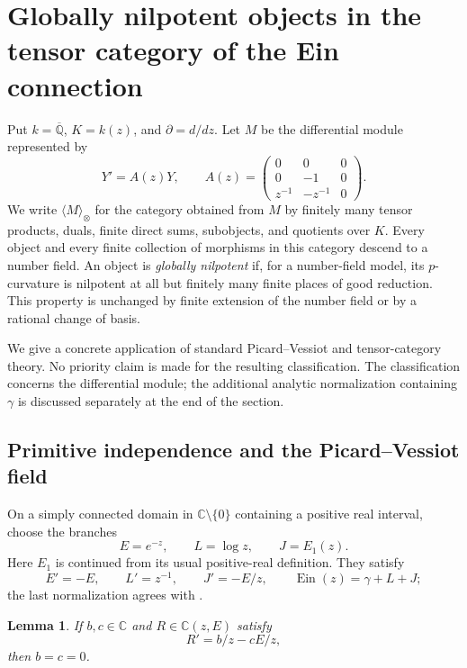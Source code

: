 \documentclass[11pt,a4paper]{article}
\newcommand{\C}{\mathbb C}
\newcommand{\Qbar}{\overline{\mathbb Q}}
\newcommand{\Ein}{\operatorname{Ein}}
\newtheorem{lemma}[theorem]{Lemma}
\theoremstyle{definition}
\theoremstyle{remark}
\numberwithin{equation}{section}
\begin{document}
\section{Globally nilpotent objects in the tensor category of the Ein connection}
\label{at:ten:section}

Put $k=\Qbar$, $K=k(z)$, and $\partial=d/dz$.  Let $M$ be the
differential module represented by
\begin{equation}\label{at:ten:connection}
 Y'=A(z)Y,\qquad
 A(z)=\begin{pmatrix}
 0&0&0\\
 0&-1&0\\
 z^{-1}&-z^{-1}&0
 \end{pmatrix}.
\end{equation}
We write $\langle M\rangle_\otimes$ for the category obtained from $M$
by finitely many tensor products, duals, finite direct sums, subobjects,
and quotients over $K$.  Every object and every finite collection of
morphisms in this category descend to a number field.  An object is
\emph{globally nilpotent} if, for a number-field model, its
$p$-curvature is nilpotent at all but finitely many finite places of
good reduction.  This property is unchanged by finite extension of
the number field or by a rational change of basis.

We give a concrete application of standard Picard--Vessiot and
tensor-category theory.  No priority claim is made for the resulting
classification.  The classification concerns the differential module;
the additional analytic normalization containing $\gamma$ is discussed
separately at the end of the section.

\subsection{Primitive independence and the Picard--Vessiot field}

On a simply connected domain in $\C\setminus\{0\}$ containing a
positive real interval, choose the branches
\[
 E=e^{-z},\qquad L=\log z,\qquad J=E_1(z).
\]
Here $E_1$ is continued from its usual positive-real definition.  They
satisfy
\begin{equation}\label{at:ten:derivatives}
 E'=-E,\qquad L'=z^{-1},\qquad J'=-E/z,
 \qquad \Ein(z)=\gamma+L+J;
\end{equation}
the last normalization agrees with \cite[Eq.~6.2.4]{at:DLMF}.

\begin{lemma}\label{at:ten:no-primitive}
If $b,c\in\C$ and $R\in\C(z,E)$ satisfy
\[
 R'=b/z-cE/z,
\]
then $b=c=0$.
\end{lemma}
\end{document}
